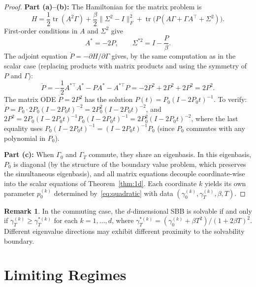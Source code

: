 \documentclass[12pt]{article}
\theoremstyle{definition}
\newtheorem{remark}[theorem]{Remark}
\newcommand{\tr}{\operatorname{tr}}
\begin{document}
\begin{proof}
\textbf{Part (a)--(b):}
The Hamiltonian for the matrix problem is
\[
H = \frac{1}{2}\tr(A^2 \Gamma) + \frac{\beta}{2}\|\Sigma^2 - I\|_F^2
  + \tr\!\big(P(A\Gamma + \Gamma A^\top + \Sigma^2)\big).
\]
First-order conditions in $A$ and $\Sigma^2$ give
\[
A^* = -2P, \qquad \Sigma^{*2} = I - \frac{P}{\beta}.
\]
The adjoint equation $\dot P = -\partial H/\partial \Gamma$ gives,
by the same computation as in the scalar case (replacing products with
matrix products and using the symmetry of $P$ and $\Gamma$):
\[
\dot P = -\frac{1}{2}A^{*\top} A^* - P A^* - A^{*\top} P
  = -2P^2 + 2P^2 + 2P^2 = 2P^2.
\]
The matrix ODE $\dot P = 2P^2$ has the solution
$P(t) = P_0(I - 2P_0 t)^{-1}$.
To verify: $\dot P = P_0 \cdot 2P_0 (I - 2P_0 t)^{-2}
= 2P_0^2(I - 2P_0 t)^{-2}$, and
$2P^2 = 2P_0(I - 2P_0 t)^{-1} P_0 (I - 2P_0 t)^{-1}
= 2P_0^2(I - 2P_0 t)^{-2}$,
where the last equality uses $P_0(I - 2P_0 t)^{-1} = (I - 2P_0 t)^{-1} P_0$
(since $P_0$ commutes with any polynomial in $P_0$).

\medskip\noindent
\textbf{Part (c):}
When $\Gamma_0$ and $\Gamma_T$ commute, they share an eigenbasis.
In this eigenbasis, $P_0$ is diagonal (by the structure of the boundary
value problem, which preserves the simultaneous eigenbasis), and all
matrix equations decouple coordinate-wise into the scalar
equations of Theorem~\ref{thm:1d}.
Each coordinate $k$ yields its own parameter $p_0^{(k)}$ determined
by~\eqref{eq:quadratic} with data
$(\gamma_0^{(k)}, \gamma_T^{(k)}, \beta, T)$.
\end{proof}

\begin{remark}\label{rem:solvability-multid}
In the commuting case, the $d$-dimensional SBB is solvable if and only if
$\gamma_T^{(k)} \ge \gamma_T^{*(k)}$ for each $k = 1, \ldots, d$, where
$\gamma_T^{*(k)} = (\gamma_0^{(k)} + \beta T^2)/(1 + 2\beta T)^2$.
Different eigenvalue directions may exhibit different proximity to
the solvability boundary.
\end{remark}

\section{Limiting Regimes}\label{sec:limits}
\end{document}
